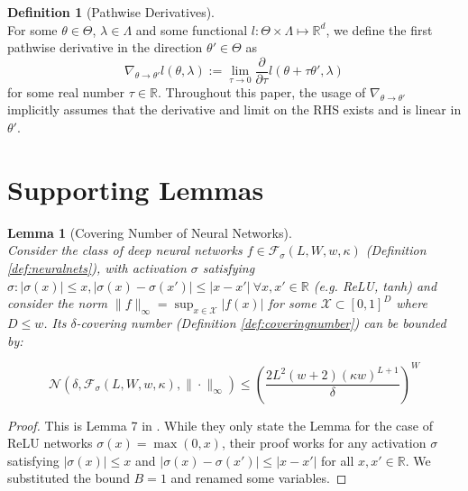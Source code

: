 \documentclass[12pt]{article}
\theoremstyle{myplain}
\newtheorem{lemma}{Lemma}[section]
\theoremstyle{definition}
\theoremstyle{definition}
\newtheorem{definition}{Definition}
\theoremstyle{remark}
\numberwithin{equation}{section}
\begin{document}
\begin{definition}[Pathwise Derivatives]\label{def:derivatives}\ \\ 
For some $\theta\in\Theta$, $\lambda\in\Lambda$ and some functional $l: \Theta\times\Lambda\mapsto \mathbb{R}^d$, we define the first pathwise derivative in the direction $\theta'\in\Theta$ as $$\nabla_{\theta\to\theta'}l(\theta, \lambda):=\lim_{\tau\to 0}\frac{\partial}{\partial \tau} l(\theta+\tau \theta', \lambda)$$ 
for some real number $\tau\in\mathbb{R}$. Throughout this paper, the usage of $\nabla_{\theta\to\theta'}$ implicitly assumes that the derivative and limit on the RHS exists and is linear in $\theta'$. 
\end{definition}



\section{Supporting Lemmas}
\label{sec:lemmas}
\begin{lemma}[Covering Number of Neural Networks]\label{lem:neuralentropy}\ \\
Consider the class of deep neural networks $f\in \mathcal{F}_{\sigma}(L, W, w, \kappa)$ (Definition \ref{def:neuralnets}), with activation $\sigma$ satisfying $\sigma: |\sigma(x)|\leq x, |\sigma(x)-\sigma(x')|\leq |x-x'| \ \forall x,x'\in\mathbb{R}$ (e.g. ReLU, tanh) and consider the norm $\|f\|_\infty=\sup_{x\in {\mathcal{X}}} |f(x)|$ for some ${\mathcal{X}}\subset [0, 1]^D$ where $D\leq w$. Its $\delta$-covering number (Definition \ref{def:coveringnumber}) can be bounded by:

\[\mathcal{N}\left(\delta, \mathcal{F}_{\sigma}(L, W, w, \kappa),\|\cdot\|_{\infty}\right) \leq\left(\frac{2 L^{2}(w+2)(\kappa w)^{L+1}}{\delta}\right)^{W}\]

\end{lemma}
\begin{proof}
This is Lemma 7 in \cite{chen2020statistical}. While they only state the Lemma for the case of ReLU networks $\sigma(x)=\max(0, x)$, their proof works for any activation $\sigma$ satisfying $|\sigma(x)|\leq x$ and $|\sigma(x)-\sigma(x')|\leq |x-x'|$ for all $x, x'\in\mathbb{R}$. We substituted the bound $B=1$ and renamed some variables.
\end{proof}
\end{document}
